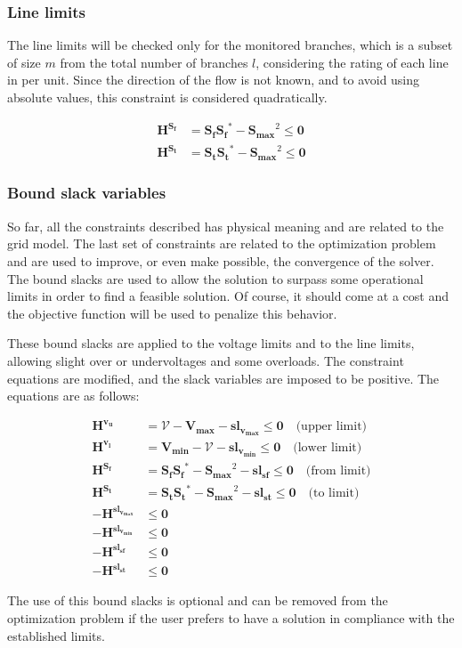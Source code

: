 \subsubsection{Line limits}

The line limits will be checked only for the monitored branches, which is a subset of size $m$ from the total number of branches $l$, considering the rating of each line in per unit. Since the direction of the flow is not known, and to
avoid using absolute values, this constraint is considered quadratically.

\begin{equation}
    \begin{split}
    \bm{H^{S_f}} &= \bm{S_f} \bm{S_f}^* - \bm{S_{max}}^2 \leq \bm{0} \\
    \bm{H^{S_t}} &= \bm{S_t} \bm{S_t}^* - \bm{S_{max}}^2 \leq \bm{0} 
    \end{split}
\end{equation}

\subsubsection{Bound slack variables}

So far, all the constraints described has physical meaning and are related to the grid model. The last set of constraints are related to the optimization problem
and are used to improve, or even make possible, the convergence of the solver. The bound slacks are used to allow the solution to surpass some operational 
limits in order to find a feasible solution. Of course, it should come at a cost and the objective function will be used to penalize this behavior. 

These bound slacks are applied to the voltage limits and to the line limits, allowing slight over or undervoltages and some overloads.
The constraint equations are modified, and the slack variables are imposed to be positive. The equations are as follows:

\begin{equation}
    \begin{split}
    \bm{H^{v_{u}}} &= \bm{\mathcal{V}} - \bm{V_{max}} - \bm{sl_{v_{max}}} \leq \bm{0} \quad \text{(upper limit)}\\
    \bm{H^{v_{l}}} &= \bm{V_{min}} - \bm{\mathcal{V}} - \bm{sl_{v_{min}}} \leq \bm{0} \quad \text{(lower limit)}\\
    \bm{H^{S_f}} &= \bm{S_f} \bm{S_f}^* - \bm{S_{max}}^2 - \bm{sl_{sf}} \leq \bm{0} \quad \text{(from limit)}\\
    \bm{H^{S_t}} &= \bm{S_t} \bm{S_t}^* - \bm{S_{max}}^2 - \bm{sl_{st}} \leq \bm{0} \quad \text{(to limit)} \\
    - \bm{H^{sl_{v_{max}}}} &\leq \bm{0} \\
    - \bm{H^{sl_{v_{min}}}} &\leq \bm{0}\\
    - \bm{H^{sl_{sf}}} &\leq \bm{0}\\
    - \bm{H^{sl_{st}}} &\leq \bm{0}
\end{split}
\end{equation}

The use of this bound slacks is optional and can be removed from the optimization problem if the user prefers to have a solution in compliance with the 
established limits.







